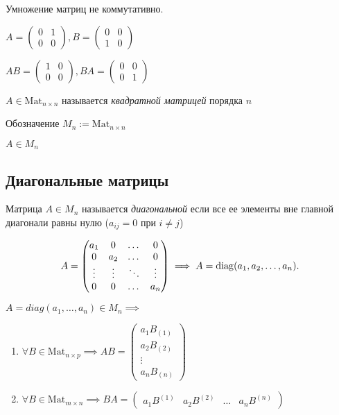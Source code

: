 Умножение матриц не коммутативно.

$A = \begin{pmatrix} 0 & 1 \\ 0 & 0 \end{pmatrix}, 
B = \begin{pmatrix} 0 & 0 \\ 1 & 0 \end{pmatrix}$

$AB = \begin{pmatrix}1 & 0 \\ 0 & 0\end{pmatrix}, 
BA = \begin{pmatrix}0 & 0 \\ 0 & 1\end{pmatrix}$

\bigskip
\begin{definition}
    $A \in \text{Mat}_{n \times n}$ называется \textit{квадратной матрицей} порядка $n$
\end{definition}

Обозначение $M_n := \text{Mat}_{n \times n}$

$A \in M_n$

\subsection{Диагональные матрицы}
\begin{definition}
    Матрица $A \in M_n$ называется \textit{диагональной} если все ее элементы вне главной диагонали равны нулю ($a_{ij} = 0$ при $i \neq j$)
\end{definition}

\begin{equation*}
    A = \begin{pmatrix} 
        a_1 & 0 & \dots & 0 \\
        0 & a_2 & \dots & 0 \\
        \vdots & \vdots & \ddots & \vdots \\
        0 & 0 & \dots & a_n
    \end{pmatrix} \implies A = \operatorname{\mathop{\mathrm{diag}}}(a_1, a_2, \dots, a_n)
.\end{equation*}

\begin{lemma}
    $A = diag(a_1, \dots, a_n) \in M_n \implies$
    \begin{enumerate}
    \item $\forall B \in \text{Mat}_{n \times p} \implies AB = \begin{pmatrix}
            a_1 B_{(1)} \\
            a_2 B_{(2)} \\
            \vdots \\
            a_n B_{(n)} 
        \end{pmatrix}$
    \item $\forall B \in \text{Mat}_{m \times n} \implies BA = \begin{pmatrix} 
            a_1 B^{(1)} & a_2 B^{(2)} & \dots & a_n B^{(n)}
        \end{pmatrix}$ 
    \end{enumerate}
\end{lemma}

